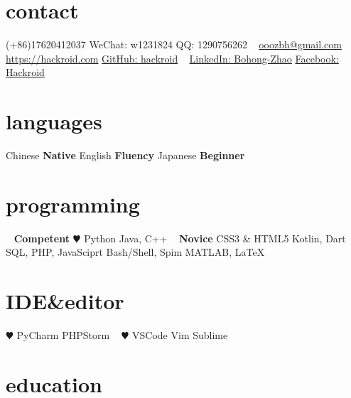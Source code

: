 \documentclass[hidelinks__VERSION__]{adamyi-cv}
\begin{document}



\begin{aside} %
\section{contact}
(+86)17620412037
WeChat: w1231824
QQ: 1290756262
~
\href{mailto:ooozbh@gmail.com}{ooozbh@gmail.com}
\href{https://hackroid.com}{https://hackroid.com}
\href{https://github.com/hackroid}{GitHub: hackroid}
~
\href{https://www.linkedin.com/in/%E5%8D%9A%E5%BC%98-%E8%B5%B5-b7ab09136/}{LinkedIn: Bohong-Zhao}
\href{https://www.facebook.com/Hackro1d}{Facebook: Hackroid}
\section{languages}
Chinese \textbf{Native}
English \textbf{Fluency}
Japanese \textbf{Beginner}
\section{programming}
~
\textbf{Competent}
{\color{red} $\varheart$} Python
Java, C++
~
\textbf{Novice}
CSS3 \& HTML5
Kotlin, Dart
SQL, PHP, JavaSciprt
Bash/Shell, Spim
MATLAB, \LaTeX
\section{IDE\&editor}
{\color{red} $\varheart$} PyCharm
PHPStorm
~
{\color{red} $\varheart$} VSCode
Vim
Sublime
\versionsection
\end{aside}


\section{education}
\end{document}
